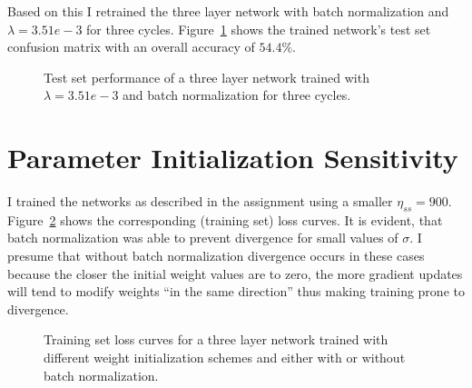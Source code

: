 \documentclass{article}
\begin{document}
\noindent
Based on this I retrained the three layer network with batch normalization and
$\lambda = 3.51e-3$ for three cycles. Figure~\ref{fig:three_layer_test}
shows the trained network's test set confusion matrix with an overall accuracy
of $54.4\%$.

\begin{figure}[H]
  \centering
    
  \caption{Test set performance of a three layer network trained with
           $\lambda = 3.51e-3$ and batch normalization for three cycles.}
  \label{fig:three_layer_test}
\end{figure}

\pagebreak

\section{Parameter Initialization Sensitivity}

I trained the networks as described in the assignment using a smaller
$\eta_{ss} = 900$. Figure~\ref{fig:stabilization} shows the corresponding
(training set) loss curves. It is evident, that batch normalization was able to
prevent divergence for small values of $\sigma$. I presume that without batch
normalization divergence occurs in these cases because the closer the initial
weight values are to zero, the more gradient updates will tend to modify weights
``in the same direction'' thus making training prone to divergence.

\begin{figure}[H]
  \centering
    
  \caption{Training set loss curves for a three layer network trained with
           different weight initialization schemes and either with or without
           batch normalization.}
  \label{fig:stabilization}
\end{figure}
\end{document}
